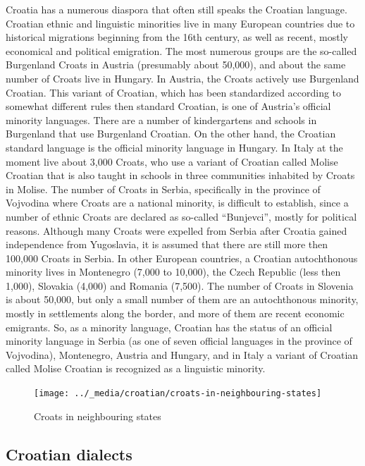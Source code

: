 \begin{multicols}{2}
Croatia has a numerous diaspora that often still speaks the Croatian language. Croatian ethnic and linguistic minorities live in many European countries due to historical migrations beginning from the 16th century, as well as recent, mostly economical and political emigration. The most numerous groups are the so-called Burgenland Croats in Austria (presumably about 50,000), and about the same number of Croats live in Hungary. In Austria, the Croats actively use Burgenland Croatian. This variant of Croatian, which has been standardized according to somewhat different rules then standard Croatian, is one of Austria’s official minority languages. There are a number of kindergartens and schools in Burgenland that use Burgenland Croatian. On the other hand, the Croatian standard language is the official minority language in Hungary. In Italy at the moment live about 3,000 Croats, who use a variant of Croatian called Molise Croatian that is also taught in schools in three communities inhabited by Croats in Molise. The number of Croats in Serbia, specifically in the province of Vojvodina where Croats are a national minority, is difficult to establish, since a number of ethnic Croats are declared as so-called “Bunjevci”, mostly for political reasons. Although many Croats were expelled from Serbia after Croatia gained independence from Yugoslavia, it is assumed that there are still more then 100,000 Croats in Serbia. In other European countries, a Croatian autochthonous minority lives in Montenegro (7,000 to 10,000), the Czech Republic (less then 1,000), Slovakia (4,000) and Romania (7,500). The number of Croats in Slovenia is about 50,000, but only a small number of them are an autochthonous minority, mostly in settlements along the border, and more of them are recent economic emigrants. So, as a minority language, Croatian has the status of an official minority language in Serbia (as one of seven official languages in the province of Vojvodina), Montenegro, Austria and Hungary, and in Italy a variant of Croatian called Molise Croatian is recognized as a linguistic minority.

\begin{figure}[htb]
  \center
  \texttt{[image: ../\_media/croatian/croats-in-neighbouring-states]}
  \caption{Croats in neighbouring states \cite{boo2}}
  \label{fig:hrvati_en}
\end{figure}

\subsection{Croatian dialects}


\end{multicols}
